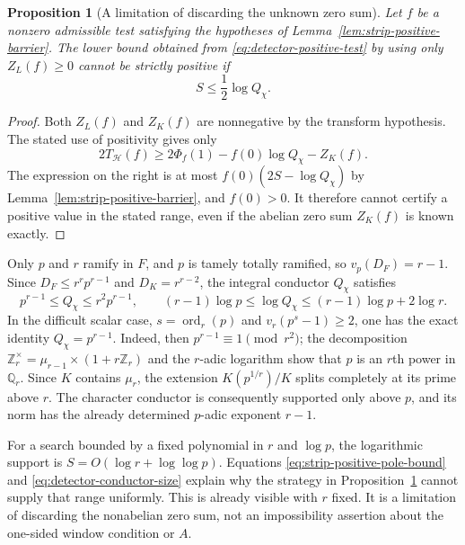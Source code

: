 \documentclass[11pt]{article}
\newtheorem{proposition}[theorem]{Proposition}
\theoremstyle{definition}
\theoremstyle{remark}
\begin{document}
\begin{proposition}[A limitation of discarding the unknown zero sum]
\label{prop:positive-discard-limitation}
Let $f$ be a nonzero admissible test satisfying the hypotheses of
Lemma~\ref{lem:strip-positive-barrier}.  The lower bound obtained
from \eqref{eq:detector-positive-test} by using only
$Z_L(f)\geq0$ cannot be strictly positive if
\[
 S\leq\frac12\log Q_\chi.
\]
\end{proposition}
\begin{proof}
Both $Z_L(f)$ and $Z_K(f)$ are nonnegative by the transform
hypothesis.  The stated use of positivity gives only
\[
 2T_{\mathcal H}(f)
 \geq 2\Phi_f(1)-f(0)\log Q_\chi-Z_K(f).
\]
The expression on the right is at most
$f(0)(2S-\log Q_\chi)$ by
Lemma~\ref{lem:strip-positive-barrier}, and $f(0)>0$.
It therefore cannot certify a positive value in the stated range,
even if the abelian zero sum $Z_K(f)$ is known exactly.
\end{proof}

Only $p$ and $r$ ramify in $F$, and $p$ is tamely totally
ramified, so $v_p(D_F)=r-1$.  Since
$D_F\leq r^rp^{r-1}$ and $D_K=r^{r-2}$, the integral conductor
$Q_\chi$ satisfies
\begin{equation}\label{eq:detector-conductor-size}
 p^{r-1}\leq Q_\chi\leq r^2p^{r-1},
 \qquad
 (r-1)\log p\leq\log Q_\chi
                   \leq(r-1)\log p+2\log r.
\end{equation}
In the difficult scalar case, $s=\operatorname{ord}_r(p)$
and $v_r(p^s-1)\geq2$, one has the exact identity
$Q_\chi=p^{r-1}$.  Indeed, then
$p^{r-1}\equiv1\pmod{r^2}$; the decomposition
$\mathbb Z_r^\times=\mu_{r-1}\times(1+r\mathbb Z_r)$
and the $r$-adic logarithm show that $p$ is an $r$th power
in $\mathbb Q_r$.  Since $K$ contains $\mu_r$, the extension
$K(p^{1/r})/K$ splits completely at its prime above $r$.
The character conductor is consequently supported only above $p$,
and its norm has the already determined $p$-adic exponent $r-1$.

For a search bounded by a fixed polynomial in $r$ and $\log p$,
the logarithmic support is $S=O(\log r+\log\log p)$.
Equations \eqref{eq:strip-positive-pole-bound} and
\eqref{eq:detector-conductor-size} explain why the strategy in
Proposition~\ref{prop:positive-discard-limitation} cannot supply
that range uniformly.  This is already visible with $r$ fixed.
It is a limitation of discarding the nonabelian zero sum, not an
impossibility assertion about the one-sided window condition or $A$.
\end{document}

